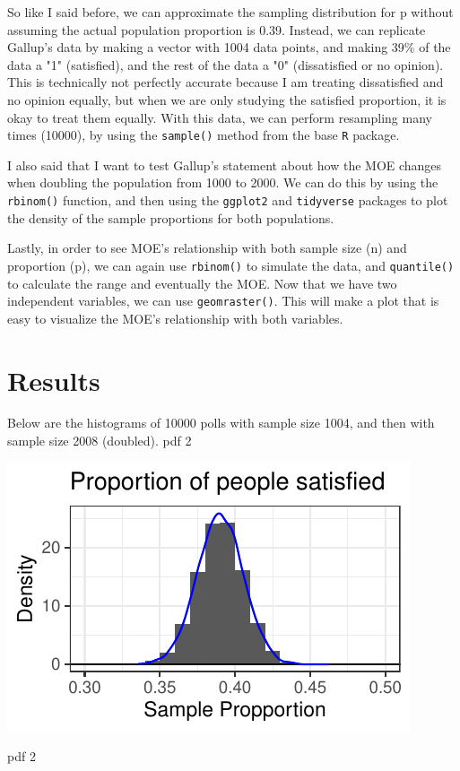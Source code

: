 \documentclass{article}\usepackage[]{graphicx}\usepackage[]{xcolor}
\newenvironment{Figure}
  {\par\medskip\noindent\minipage{\linewidth}}
  {\endminipage\par\medskip}
\begin{document}
\begin{multicols}{2}
So like I said before, we can approximate the sampling distribution for p without assuming the actual population proportion is 0.39. Instead, we can replicate Gallup's data by making a vector with 1004 data points, and making 39\% of the data a "1" (satisfied), and the rest of the data a "0" (dissatisfied or no opinion). This is technically not perfectly accurate because I am treating dissatisfied and no opinion equally, but when we are only studying the satisfied proportion, it is okay to treat them equally. With this data, we can perform resampling many times (10000), by using the \texttt{sample()} method from the base \texttt{R} package.

I also said that I want to test Gallup's statement about how the MOE changes when doubling the population from 1000 to 2000. We can do this by using the \texttt{rbinom()} function, and then using the \texttt{ggplot2} \citep{ggplot2} and \texttt{tidyverse} \citep{tidyverse} packages to plot the density of the sample proportions for both populations.

Lastly, in order to see MOE's relationship with both sample size (n) and proportion (p), we can again use \texttt{rbinom()} to simulate the data, and \texttt{quantile()} to calculate the range and eventually the MOE. Now that we have two independent variables, we can use \texttt{geom\textunderscore raster()}. This will make a plot that is easy to visualize the MOE's relationship with both variables.
\section{Results}
Below are the histograms of 10000 polls with sample size 1004, and then with sample size 2008 (doubled).
pdf 
  2 

\begin{Figure}
\includegraphics{Histogram1.pdf}
\label{fig:histogram1}
\end{Figure}
pdf 
  2 


\end{multicols}
\end{document}
